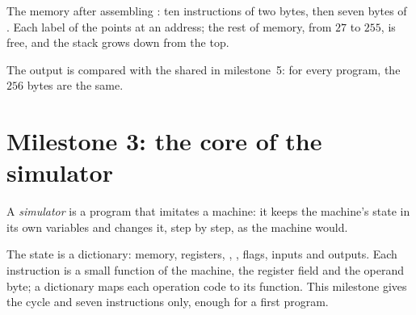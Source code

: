 \begin{omfigure}

{\small The memory after assembling : ten instructions of two bytes, then seven bytes of
. Each label of the  points at an address; the rest of memory, from $27$ to $255$, is free,
and the stack grows down from the top.}
\end{omfigure}

The output is compared with the shared  in milestone~5: for every program, the $256$ bytes are the same.

\section{Milestone 3: the core of the simulator}\label{sec:g11:project-toy-machine:m3}

\begin{definition}[Simulator]\label{def:g11:project-toy-machine:simulator}
A \emph{simulator} is a program that imitates a machine: it keeps the machine's state in its own
variables and changes it, step by step, as the machine would.
\end{definition}

The state is a dictionary: memory, registers, , , flags, inputs and outputs. Each instruction is a
small function of the machine, the register field and the operand byte; a dictionary maps each operation code to its
function. This milestone gives the cycle and seven instructions only, enough for a first program.

